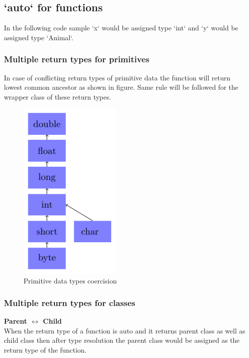 
\subsection{`auto` for functions}
In the following code sample `x` would be assigned type `int` and `y` would be assigned type `Animal`. \\

\subsubsection{Multiple return types for primitives}
In case of conflicting return types of primitive data the function will return lowest common ancestor as shown in figure. Same rule will be followed for the wrapper class of these return types. 

\begin{figure}
\centering
\includegraphics[width = 5cm]{diagram3.pdf}
\caption{Primitive data types coercision}
\end{figure}

\subsubsection{Multiple return types for classes}
\textbf{Parent $\leftrightarrow$ Child}\\
When the return type of a function is auto and it returns parent class as well as child class then after type resolution the parent class would be assigned as the return type of the function.

